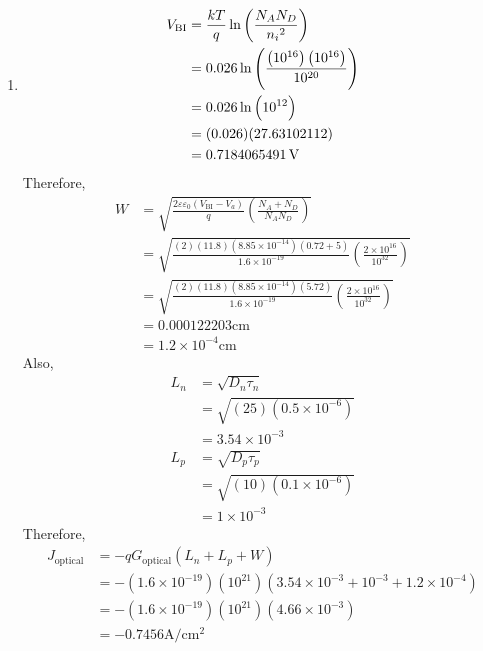 \documentclass[fleqn, a4paper, 10pt, oneside]{amsart}
\theoremstyle{definition}
\theoremstyle{theorem}
\begin{document}
\begin{solution}
	\begin{enumerate}[leftmargin=*]
		\item
			\begin{align*}
				V_{\text{BI}} &= \frac{k T}{q} \ln\left( \frac{N_A N_D}{{n_i}^2} \right)\\
				&= 0.026 \ln\left( \frac{\left( 10^{16} \right) \left( 10^{16} \right)}{10^{20}} \right)\\
				&= 0.026 \ln\left( 10^{12} \right)\\
				&= (0.026) (27.63102112)\\
				&= 0.7184065491 \volt
			\end{align*}
			Therefore,
			\begin{align*}
				W &= \sqrt{\frac{2 \varepsilon \varepsilon_0 (V_{\text{BI}} - V_a)}{q} \left( \frac{N_A + N_D}{N_A N_D} \right)}\\
				&= \sqrt{\frac{(2) (11.8) \left( 8.85 \times 10^{-14} \right) (0.72 + 5)}{1.6 \times 10^{-19}} \left( \frac{2 \times 10^{16}}{10^{32}} \right)}\\
				&= \sqrt{\frac{(2) (11.8) \left( 8.85 \times 10^{-14} \right) (5.72)}{1.6 \times 10^{-19}} \left( \frac{2 \times 10^{16}}{10^{32}} \right)}\\
				&= 0.000122203 \si{\centi\metre}\\
				&= 1.2 \times 10^{-4} \si{\centi\metre}
			\end{align*}
			Also,
			\begin{align*}
				L_n &= \sqrt{D_n \tau_n}\\
				&= \sqrt{(25) \left( 0.5 \times 10^{-6} \right)}\\
				&= 3.54 \times 10^{-3}\\
				L_p &= \sqrt{D_p \tau_p}\\
				&= \sqrt{(10) \left( 0.1 \times 10^{-6} \right)}\\
				&= 1 \times 10^{-3}
			\end{align*}
			Therefore,
			\begin{align*}
				J_{\text{optical}} &= -q G_{\text{optical}} \left( L_n + L_p + W \right)\\
				&= -\left( 1.6 \times 10^{-19} \right) \left( 10^{21} \right) \left( 3.54 \times 10^{-3} + 10^{-3} + 1.2 \times 10^{-4} \right)\\
				&= -\left( 1.6 \times 10^{-19} \right) \left( 10^{21} \right) \left( 4.66 \times 10^{-3} \right)\\
				&= -0.7456 \si{\ampere\per\centi\metre\squared}

\end{align*}
\end{enumerate}
\end{solution}
\end{document}
